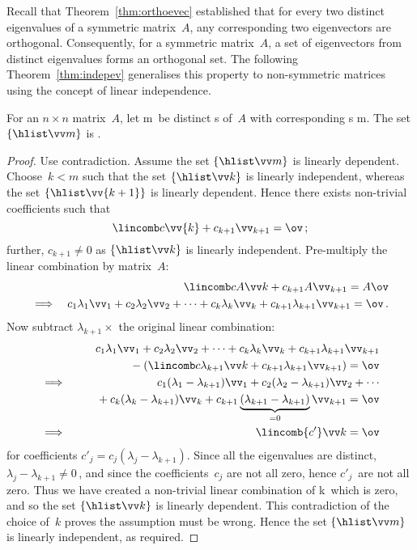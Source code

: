 Recall that Theorem~\ref{thm:orthoevec} established that for every two distinct {eigenvalue}s of a symmetric matrix~\(A\), any corresponding two {eigenvector}s are {orthogonal}.
Consequently, for a symmetric matrix~\(A\), a set of eigenvectors from distinct eigenvalues forms an orthogonal set.
The following Theorem~\ref{thm:indepev} generalises this property to non-symmetric matrices using the concept of linear independence.


\begin{theorem} \label{thm:indepev}
For an \(n\times n\) matrix~\(A\), let \hlist\lambda m\ be distinct s of~\(A\) with corresponding s \hlist\vv m.
The set \(\{\hlist \vv m\}\) is .
\end{theorem}
\begin{proof} 
Use contradiction.
Assume the set \(\{\hlist \vv m\}\) is linearly dependent.
Choose~\(k<m\) such that the set \(\{\hlist\vv k\}\) is linearly independent, whereas the set \(\{\hlist\vv{k+1}\}\) is linearly dependent.
Hence there exists non-trivial coefficients such that 
\begin{equation*}
\lincomb c\vv{k}+c_{k+1}\vv_{k+1}=\ov\,;
\end{equation*}
further, \(c_{k+1}\neq0\) as \(\{\hlist\vv k\}\) is linearly independent.
Pre-multiply the linear combination by matrix~\(A\):
\begin{eqnarray*}&&
\lincomb c{A\vv}k+c_{k+1}A\vv_{k+1}=A\ov
\\\implies&&
c_1\lambda_1\vv_1+c_2\lambda_2\vv_2+\cdots+c_k\lambda_k\vv_k+c_{k+1}\lambda_{k+1}\vv_{k+1}=\ov\,.
\end{eqnarray*}
Now subtract \(\lambda_{k+1}\times\) the original linear combination:
\begin{eqnarray*}&&
\phantom{{}+(}c_1\lambda_1\vv_1+c_2\lambda_2\vv_2+\cdots+c_k\lambda_k\vv_k+c_{k+1}\lambda_{k+1}\vv_{k+1}
\\&&{}
-\left(\lincomb c{\lambda_{k+1}\vv}{k}
+c_{k+1}\lambda_{k+1}\vv_{k+1}\right)=\ov
\\\implies&&
c_1(\lambda_1-\lambda_{k+1})\vv_1+c_2(\lambda_2-\lambda_{k+1})\vv_2+\cdots
\\&&{}
+c_k(\lambda_k-\lambda_{k+1})\vv_k
+c_{k+1}\underbrace{(\lambda_{k+1}-\lambda_{k+1})}_{=0}\vv_{k+1}=\ov
\\\implies&&
\lincomb{c'}\vv k=\ov
\end{eqnarray*}
for coefficients \(c'_j=c_j(\lambda_j-\lambda_{k+1})\).
Since all the eigenvalues are distinct, \(\lambda_j-\lambda_{k+1}\neq0\)\,, and since the coefficients~\(c_j\) are not all zero, hence \(c'_j\)~are not all zero.
Thus we have created a non-trivial linear combination of \hlist \vv k\ which is zero, and so the set \(\{\hlist\vv k\}\) is linearly dependent.
This contradiction of the choice of~\(k\) proves the assumption must be wrong.
Hence the set \(\{\hlist \vv m\}\) is linearly independent, as required.
\end{proof}



